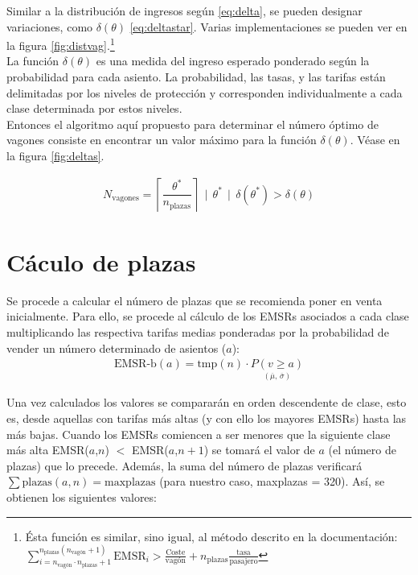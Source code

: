 \documentclass[12pt]{article}
\begin{document}
Similar a la distribución de ingresos según \eqref{eq:delta}, se pueden designar variaciones, como $\delta(\theta)$ \eqref{eq:deltastar}. Varias implementaciones se pueden ver en la figura \nolinebreak \ref{fig:distvag}.\footnote{Ésta función es similar, sino igual, al método descrito en la documentación: $\sum_{i = n_{\text{vagón}} \cdot n_{\text{plazas}} + 1}^{n_{\text{plazas}}(n_{\text{vagón}} + 1)} \text{EMSR}_i > \frac{\text{Coste}}{\text{vagón}} + n_{\text{plazas}} \frac{\text{tasa}}{\text{pasajero}}$}\\

La función $\delta(\theta)$ es una medida del ingreso esperado ponderado según la probabilidad para cada asiento. La probabilidad, las tasas, y las tarifas están delimitadas por los niveles de protección y corresponden individualmente a cada clase determinada por estos niveles.\\

Entonces el algoritmo aquí propuesto para determinar el número óptimo de vagones consiste en encontrar un valor máximo para la función $\delta(\theta)$. Véase en la figura \ref{fig:deltas}.


\begin{align}
N_{\text{vagones}} = \left\lceil\dfrac{\theta^*}{n_{\text{plazas}}}\right\rceil \, \mid \, \theta^* \, \mid \, \delta(\theta^*) > \delta(\theta)
\end{align}



\section{Cáculo de plazas}

Se procede a calcular el número de plazas que se recomienda poner en venta inicialmente. Para ello, se procede al cálculo de los EMSRs asociados a  cada clase multiplicando las respectiva tarifas medias ponderadas por la probabilidad de vender un número determinado de asientos ($a$):
\begin{align}
\text{EMSR-b}(a) = \text{tmp}(n)\cdot \underset{(\overline{\mu}, \, \overline{\sigma})}{P(v \geq a)}
\end{align}

%
Una vez calculados los valores se compararán en orden descendente de clase, esto es, desde aquellas con tarifas más altas (y con ello los mayores EMSRs) hasta las más bajas. Cuando los EMSRs comiencen a ser menores que la siguiente clase más alta EMSR($a$,$n$) $<$ EMSR($a$,$n+1$) se tomará el valor de $a$ (el número de plazas) que lo precede. Además, la suma del número de plazas verificará $\sum\text{plazas}(a,n) = \text{maxplazas}$ (para nuestro caso, maxplazas = 320). Así, se obtienen los siguientes valores:
%
\end{document}
